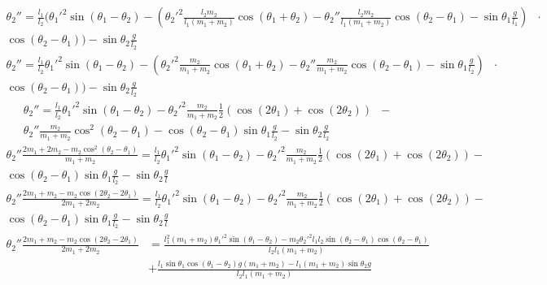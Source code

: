 \documentclass[12pt, a4paper]{article}
\begin{document}
\begin{align*}
    \theta_2'' = \frac{l_1}{l_2} (\theta_1'^2 \sin (\theta_1 - \theta_2) - \left( \theta_2'^2 \frac{l_2m_2}{l_1(m_1 + m_2)}  \cos(\theta_1 + \theta_2) - \theta_2'' \frac{l_2 m_2}{l_1(m_1 + m_2)} \cos(\theta_2 - \theta_1) - \sin \theta_1 \frac{g}{l_1} \right) & {}\cdot{} \\
    \cos(\theta_2 - \theta_1)) - \sin \theta_2 \frac{g}{l_2}
\end{align*}
\begin{align*}
    \theta_2'' = \frac{l_1}{l_2}\theta_1'^2 \sin (\theta_1 - \theta_2) - \left(\theta_2'^2 \frac{m_2}{m_1 + m_2}  \cos(\theta_1 + \theta_2) - \theta_2'' \frac{m_2}{m_1 + m_2} \cos(\theta_2 - \theta_1) - \sin \theta_1 \frac{g}{l_2} \right) & {}\cdot{} \\
    \cos(\theta_2 - \theta_1)) - \sin \theta_2 \frac{g}{l_2}
\end{align*}
\begin{align*}
    \theta_2'' = \frac{l_1}{l_2}\theta_1'^2 \sin (\theta_1 - \theta_2) - \theta_2'^2 \frac{m_2}{m_1 + m_2} \frac{1}{2} (\cos(2\theta_1) + \cos(2\theta_2)) & {}-{} \\
    \theta_2'' \frac{m_2}{m_1 + m_2} \cos^2(\theta_2 - \theta_1) - \cos(\theta_2 - \theta_1)\sin \theta_1 \frac{g}{l_2} - \sin \theta_2 \frac{g}{l_2}
\end{align*}
\begin{align*}
    \theta_2''\frac{2m_1 + 2m_2 - m_2 \cos^2(\theta_2 - \theta_1)}{m_1 + m_2} = \frac{l_1}{l_2}\theta_1'^2 \sin (\theta_1 - \theta_2) - \theta_2'^2 \frac{m_2}{m_1 + m_2} \frac{1}{2} (\cos(2\theta_1) + \cos(2\theta_2)) {}-{} \\
    \cos(\theta_2 - \theta_1)\sin \theta_1 \frac{g}{l_2} - \sin \theta_2 \frac{g}{l}
\end{align*}
\begin{align*}
    \theta_2''\frac{2m_1 + m_2 - m_2 \cos(2\theta_2 - 2\theta_1)}{2m_1 + 2m_2} = \frac{l_1}{l_2}\theta_1'^2 \sin (\theta_1 - \theta_2) - \theta_2'^2 \frac{m_2}{m_1 + m_2} \frac{1}{2} (\cos(2\theta_1) + \cos(2\theta_2)) {}-{} \\
    \cos(\theta_2 - \theta_1)\sin \theta_1 \frac{g}{l_2} - \sin \theta_2 \frac{g}{l}
\end{align*}
\begin{align*}
    \theta_2''\frac{2m_1 + m_2 - m_2\cos(2\theta_2 - 2\theta_1)}{2m_1 + 2m_2} & = \frac{l_1^2(m_1 + m_2)\theta_1'^2\sin (\theta_1 -\theta_2) - m_2\theta_2'^2 l_1l_2\sin(\theta_2 -\theta_1)\cos(\theta_2 -\theta_1)}{l_2l_1(m_1 + m_2)} \\
                                                                              & + \frac{l_1\sin \theta_1 \cos(\theta_1 -\theta_2)g(m_1 + m_2) - l_1(m_1 + m_2)\sin \theta_2 g}{l_2l_1(m_1 + m_2)}
\end{align*}
\end{document}
